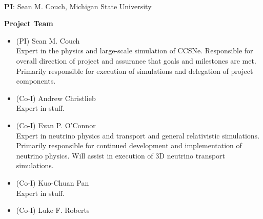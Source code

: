 \documentclass[12pt,letterpaper,english]{article}
\begin{document}
\setlength{\parindent}{0in}


\pagestyle{fancy}
\renewcommand{\headrulewidth}{0.0pt}

\begin{center} \textbf{\doctitle{}} \\
\end{center}

\textbf{PI}:
Sean M. Couch, Michigan State University \\
\medskip

\textbf{Project Team}

\begin{itemize}
\setlength{\itemsep}{-14pt}

\item (PI) Sean M. Couch \\
Expert in the physics and large-scale simulation of CCSNe.  Responsible for overall direction of project and assurance that goals
and milestones are met.  Primarily responsible for execution of
simulations and delegation of project components.\\
\item (Co-I) Andrew Christlieb \\
Expert in stuff.
\item (Co-I) Evan P. O'Connor \\
Expert in neutrino physics and transport and general relativistic
simulations.  Primarily responsible for continued development and
implementation of neutrino physics.  Will assist in execution of 3D neutrino transport simulations.  \\
\item (Co-I) Kuo-Chuan Pan \\
Expert in stuff.
\item (Co-I) Luke F. Roberts \\

\end{itemize}
\end{document}
